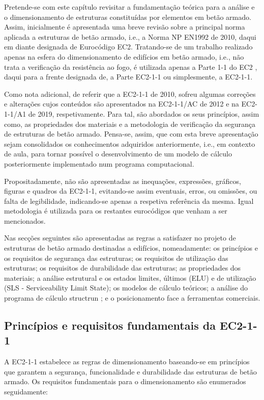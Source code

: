 Pretende-se com este capítulo revisitar a fundamentação teórica para a análise e o dimensionamento de estruturas constituídas por elementos em betão armado. 
Assim, inicialmente é apresentada uma breve revisão sobre a principal norma aplicada a estruturas de betão armado, i.e., a Norma NP EN1992 de 2010, daqui em diante designada de Eurocódigo EC2. 
Tratando-se de um trabalho realizado apenas na esfera do dimensionamento de edifícios em betão armado, i.e., não trata a verificação da resistência ao fogo, é utilizada apenas a Parte 1-1 do EC2 \cite{EN1992}, 
daqui para a frente designada de, a Parte EC2-1-1 ou simplesmente, a EC2-1-1.

Como nota adicional, de referir que a EC2-1-1 de 2010, sofreu algumas correções e alterações cujos conteúdos são apresentados na EC2-1-1/AC de 2012 e na EC2-1-1/A1 de 2019, respetivamente. Para tal, são abordados os seus princípios, assim como, as propriedades dos materiais e a metodologia de verificação da segurança de estruturas de betão armado. Pensa-se, assim, que com esta breve apresentação sejam consolidados os conhecimentos adquiridos anteriormente, i.e., em contexto de aula, para tornar possível o desenvolvimento de um modelo de cálculo posteriormente implementado num programa computacional.

Propositadamente, não são apresentadas as inequações, expressões, gráficos, figuras e quadros da EC2-1-1, evitando-se assim eventuais, erros, ou omissões, ou falta de legibilidade, indicando-se apenas a respetiva referência da mesma. Igual metodologia é utilizada para os restantes eurocódigos que venham a ser mencionados.

Nas secções seguintes são apresentadas as regras a satisfazer no projeto de estruturas de betão armado destinadas a edifícios, nomeadamente: os princípios e os requisitos de segurança das estruturas; 
os requisitos de utilização das estruturas; os requisitos de durabilidade das estruturas; as propriedades dos materiais; a análise estrutural e os estados limites, últimos (ELU) e de utilização (SLS - Serviceability Limit State); 
os modelos de cálculo teóricos; a análise do programa de cálculo structrun \cite{Structrun}; e o posicionamento face a ferramentas comerciais.

\subsection{Princípios e requisitos fundamentais da EC2-1-1}
A EC2-1-1 estabelece as regras de dimensionamento baseando-se em princípios que garantem a segurança, funcionalidade e durabilidade das estruturas de betão armado.
 Os requisitos fundamentais para o dimensionamento são enumerados seguidamente:
 
